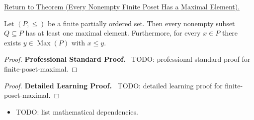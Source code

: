 \newpage
{}
\label{prf:finite-poset-maximal}

\begin{remark*}[Return]
\hyperref[prop:finite-poset-maximal]{Return to Theorem (Every Nonempty Finite Poset Has a Maximal Element).}
\end{remark*}

\begin{theorem*}
Let $(P, \leq)$ be a finite partially ordered set.  Then every nonempty
subset $Q \subseteq P$ has at least one maximal element.  Furthermore,
for every $x \in P$ there exists $y \in \operatorname{Max}(P)$ with
$x \leq y$.
\end{theorem*}

\begin{proof}
\textbf{Professional Standard Proof.}~
TODO: professional standard proof for finite-poset-maximal.
\end{proof}

\begin{proof}
\textbf{Detailed Learning Proof.}~
TODO: detailed learning proof for finite-poset-maximal.
\end{proof}

\begin{remark*}
\end{remark*}

\begin{dependencies}
\begin{itemize}
  \item TODO: list mathematical dependencies.
\end{itemize}
\end{dependencies}

\clearpage
